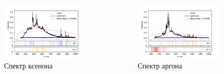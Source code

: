 \documentclass{beamer}
\begin{document}
\begin{frame}
\begin{itemize}
\begin{columns}
				\begin{figure}
					\centering
					\includegraphics[width=\linewidth]{gen/xe_lines.pdf}
					\caption*{Спектр ксенона}
				\end{figure}
				
				\begin{figure}
					\centering
					\includegraphics[width=\linewidth]{gen/ar_lines.pdf}
					\caption*{Спектр аргона}
				\end{figure}
				
			\end{columns}
			
		\end{itemize}
		
	\end{frame}
	
\end{document}
